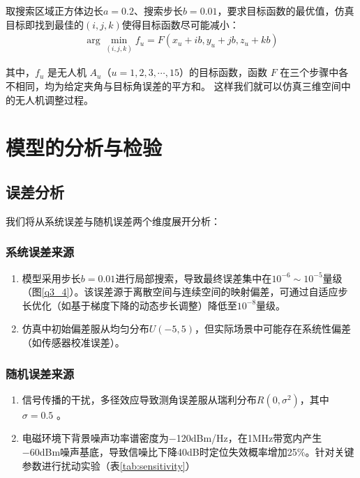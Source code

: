 \documentclass[withoutpreface,bwprint]{cumcmthesis} %
\begin{document}
取搜索区域正方体边长\( a = 0.2 \)、搜索步长\( b = 0.01 \)，要求目标函数的最优值，仿真目标即找到最佳的\( (i,j,k) \)使得目标函数尽可能减小：
\begin{align}
    \arg\min\limits_{(i,j,k)} f_u = F(x_u + ib, y_u + jb, z_u + kb)
\end{align}


其中，\( f_u \) 是无人机 \( A_u \)（\( u = 1,2,3,\cdots,15 \)）的目标函数，函数 \( F \) 在三个步骤中各不相同，均为给定夹角与目标角误差的平方和。
这样我们就可以仿真三维空间中的无人机调整过程。


\section{模型的分析与检验}
\subsection{误差分析}
我们将从系统误差与随机误差两个维度展开分析：

\subsubsection{系统误差来源}


\begin{enumerate}
    \item 模型采用步长$b=0.01$进行局部搜索，导致最终误差集中在$10^{-6} \sim 10^{-5}$量级（图\ref{q3_4}）。该误差源于离散空间与连续空间的映射偏差，可通过自适应步长优化（如基于梯度下降的动态步长调整）降低至$10^{−8}$量级。
    \item ​仿真中初始偏差服从均匀分布$U(−5,5)$，但实际场景中可能存在系统性偏差（如传感器校准误差）。
    
\end{enumerate}
\subsubsection{随机误差来源}

\begin{enumerate}
    \item ​​信号传播的干扰​，多径效应导致测角误差服从瑞利分布$R(0,\sigma^2)$，其中$\sigma=0.5$ 。
    \item ​​电磁环境下背景噪声功率谱密度为−120dBm/Hz，在1MHz带宽内产生−60dBm噪声基底，导致信噪比下降40dB时定位失效概率增加25\%。针对关键参数进行扰动实验（表\ref{tab:sensitivity}）
\end{enumerate}
\end{document}

